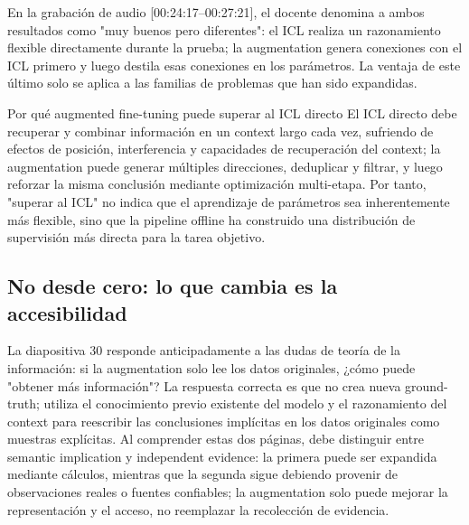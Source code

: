 

En la grabación de audio [00:24:17--00:27:21], el docente denomina a ambos resultados como "muy buenos pero diferentes": el ICL realiza un razonamiento flexible directamente durante la prueba; la augmentation genera conexiones con el ICL primero y luego destila esas conexiones en los parámetros. La ventaja de este último solo se aplica a las familias de problemas que han sido expandidas.

\begin{knowledgebox}{Por qué augmented fine-tuning puede superar al ICL directo}
El ICL directo debe recuperar y combinar información en un context largo cada vez, sufriendo de efectos de posición, interferencia y capacidades de recuperación del context; la augmentation puede generar múltiples direcciones, deduplicar y filtrar, y luego reforzar la misma conclusión mediante optimización multi-etapa. Por tanto, "superar al ICL" no indica que el aprendizaje de parámetros sea inherentemente más flexible, sino que la pipeline offline ha construido una distribución de supervisión más directa para la tarea objetivo.
\end{knowledgebox}

\subsection{No desde cero: lo que cambia es la accesibilidad}

La diapositiva 30 responde anticipadamente a las dudas de teoría de la información: si la augmentation solo lee los datos originales, ¿cómo puede "obtener más información"? La respuesta correcta es que no crea nueva ground-truth; utiliza el conocimiento previo existente del modelo y el razonamiento del context para reescribir las conclusiones implícitas en los datos originales como muestras explícitas. Al comprender estas dos páginas, debe distinguir entre semantic implication y independent evidence: la primera puede ser expandida mediante cálculos, mientras que la segunda sigue debiendo provenir de observaciones reales o fuentes confiables; la augmentation solo puede mejorar la representación y el acceso, no reemplazar la recolección de evidencia.


